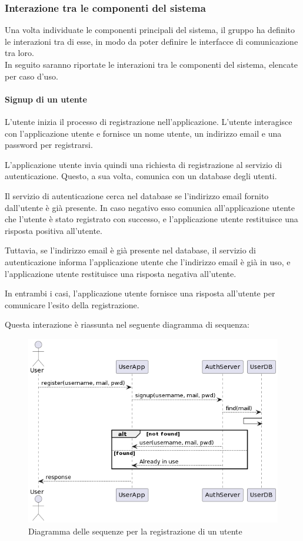 \subsubsection{Interazione tra le componenti del sistema}
Una volta individuate le componenti principali del sistema, il gruppo ha definito le interazioni tra di esse, in modo da poter definire le interfacce di comunicazione tra loro.\\
In seguito saranno riportate le interazioni tra le componenti del sistema, elencate per caso d'uso.\\

\paragraph{Signup di un utente}
L'utente inizia il processo di registrazione nell'applicazione. L'utente interagisce con l'applicazione utente e fornisce un nome utente, un indirizzo email e una password per registrarsi.

L'applicazione utente invia quindi una richiesta di registrazione al servizio di autenticazione. Questo, a sua volta, comunica con un database degli utenti.

Il servizio di autenticazione cerca nel database se l'indirizzo email fornito dall'utente è già presente. In caso negativo esso comunica all'applicazione utente che l'utente è stato registrato con successo, e l'applicazione utente restituisce una risposta positiva all'utente.

Tuttavia, se l'indirizzo email è già presente nel database, il servizio di autenticazione informa l'applicazione utente che l'indirizzo email è già in uso, e l'applicazione utente restituisce una risposta negativa all'utente.

In entrambi i casi, l'applicazione utente fornisce una risposta all'utente per comunicare l'esito della registrazione.

Questa interazione è riassunta nel seguente diagramma di sequenza:
\begin{figure}[htbp]
    \centering
    \includegraphics[width=\textwidth]{images/signup.png}
    \caption{Diagramma delle sequenze per la registrazione di un utente}
    \label{fig:signup}
\end{figure}

